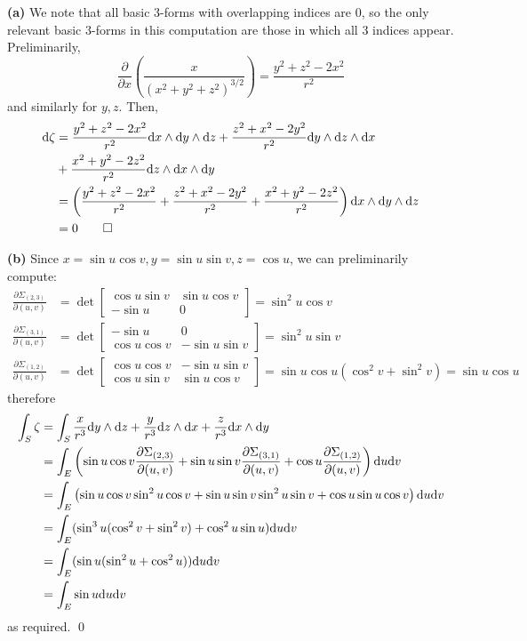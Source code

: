 \documentclass[a4paper, 12pt]{article}
\begin{document}
\begin{solution}
\textbf{(a)}
We note that all basic 3-forms with overlapping indices are 0, so the only relevant basic 3-forms in this computation are those in which all 3 indices appear. 
Preliminarily, 
\begin{equation*}
    \frac{\partial}{\partial x}\left( \frac{x}{(x^2 + y^2 + z^2)^{3/2}} \right)= \frac{y^2 + z^2 - 2x^2}{r^2}
\end{equation*}
and similarly for $y, z$. Then,
\begin{align*}
\mathrm{d} \zeta &= \frac{y^2 + z^2 - 2x^2}{r^2} \mathrm{d} x \wedge \mathrm{d} y \wedge \mathrm{d} z + \frac{z^2 + x^2 - 2y^2}{r^2} \mathrm{d} y \wedge \mathrm{d} z \wedge \mathrm{d} x \\
&+ \frac{x^2 + y^2 - 2z^2}{r^2} \mathrm{d} z \wedge \mathrm{d} x \wedge \mathrm{d} y \\
&= \left(\frac{y^2 + z^2 - 2x^2}{r^2} + \frac{z^2 + x^2 - 2y^2}{r^2} + \frac{x^2 + y^2 - 2z^2}{r^2}\right) \mathrm{d} x \wedge \mathrm{d} y \wedge \mathrm{d} z \\
&= 0 \qed
\end{align*}

\textbf{(b)}
Since $x = \sin u \cos v, y = \sin u \sin v, z = \cos u$, we can preliminarily compute:
\begin{align*}
    \frac{\partial \Sigma_{(2, 3)}}{\partial (u, v)} &= \det \begin{bmatrix}
        \cos u \sin v & \sin u \cos v \\
        -\sin u & 0
    \end{bmatrix} = \sin^2 u \cos v \\
    \frac{\partial \Sigma_{(3, 1)}}{\partial (u, v)} &= \det \begin{bmatrix}
        -\sin u & 0 \\
        \cos u \cos v & -\sin u \sin v
    \end{bmatrix} = \sin^2 u \sin v \\
    \frac{\partial \Sigma_{(1, 2)}}{\partial (u, v)} &= \det \begin{bmatrix}
        \cos u \cos v & -\sin u \sin v \\
        \cos u \sin v & \sin u \cos v
    \end{bmatrix} = \sin u \cos u (\cos^2 v + \sin^2 v) = \sin u \cos u
\end{align*}
therefore
\begin{align*}
    \int_S \zeta &= \int_S \frac{x}{r^3}\mathrm{d} y \wedge \mathrm{d} z + \frac{y}{r^3} \mathrm{d} z \wedge \mathrm{d} x + \frac{z}{r^3} \mathrm{d} x \wedge \mathrm{d} y \\
    &= \int_E \left(\sin u \cos v \frac{\partial \Sigma_{(2, 3)}}{\partial (u, v)} + \sin u \sin v \frac{\partial \Sigma_{(3, 1)}}{\partial (u, v)} + \cos u \frac{\partial \Sigma_{(1, 2)}}{\partial (u, v)} \right) \mathrm{d} u \mathrm{d} v\\
    &= \int_E \left(\sin u \cos v \sin^2 u \cos v + \sin u \sin v \sin^2 u \sin v + \cos u \sin u \cos v\right) \mathrm{d} u \mathrm{d} v\\
    &= \int_E (\sin^3 u (\cos^2 v + \sin^2 v) + \cos^2 u \sin u) \mathrm{d} u \mathrm{d} v \\
    &= \int_E (\sin u (\sin^2 u + \cos^2 u)) \mathrm{d} u \mathrm{d} v \\
    &= \int_E \sin u \mathrm{d} u \mathrm{d} v
\end{align*}
as required. \qed 


\end{solution}
\end{document}
